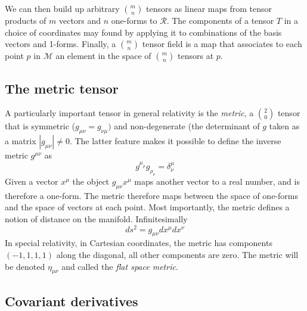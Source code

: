 We can then build up arbitrary ${m \choose n}$ tensors as linear maps
from tensor products of $m$ vectors and $n$ one-forms to
$\mathcal{R}$.  The components of a tensor $T$ in a choice of
coordinates may found by applying it to combinations of the basis
vectors and 1-forms.  Finally, a ${m \choose n}$ tensor field is a map
that associates to each point $p$ in $\mathcal{M}$ an element in the
space of  ${m \choose n}$ tensors at $p$.

\subsection{The metric tensor}

A particularly important tensor in general relativity is the
\emph{metric}, a ${2 \choose 0}$ tensor that is symmetric ($g_{\mu\nu}
= g_{\nu\mu})$ and non-degenerate (the determinant of $g$ taken as a
matrix $|g_{\mu\nu}| \neq 0$.  The latter feature makes it possible to
define the inverse metric $g^{\mu\nu}$ as
%
\begin{equation*} g^{\mu_\rho} g_{\rho_\nu} = \delta^\mu_\nu
\end{equation*}
%
Given a vector $x^\mu$ the object $g_{\mu\nu} x^\mu$ maps another
vector to a real number, and is therefore a one-form.  The metric
therefore maps between the space of one-forms and the space of vectors
at each point.  Most importantly, the metric defines a notion of
distance on the manifold.  Infinitesimally
%
\begin{equation} ds^2 = g_{\mu\nu} dx^\mu dx^\nu \end{equation}
%
In special relativity, in Cartesian coordinates, the metric has
components $(-1,1,1,1)$ along the diagonal, all other components are
zero.   The metric will be denoted $\eta_{\mu\nu}$ and called the
\emph{flat space metric}.

\subsection{Covariant derivatives}

